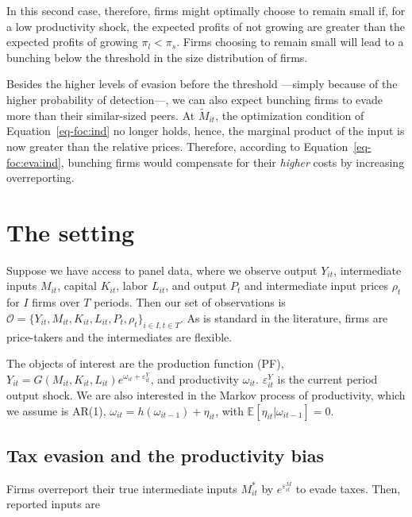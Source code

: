 \documentclass[
  12pt]{article}
\theoremstyle{definition}
\theoremstyle{remark}
\begin{document}
In this second case, therefore, firms might optimally choose to remain
small if, for a low productivity shock, the expected profits of not
growing are greater than the expected profits of growing
\(\pi_l<\pi_s\). Firms choosing to remain small will lead to a bunching
below the threshold in the size distribution of firms.

Besides the higher levels of evasion before the threshold ---simply
because of the higher probability of detection---, we can also expect
bunching firms to evade more than their similar-sized peers. At
\(\tilde{M}_{it}\), the optimization condition of
Equation~\ref{eq-foc:ind} no longer holds, hence, the marginal product
of the input is now greater than the relative prices. Therefore,
according to Equation~\ref{eq-foc:eva:ind}, bunching firms would
compensate for their \emph{higher} costs by increasing overreporting.

\hypertarget{the-setting}{%
\section{The setting}\label{the-setting}}

Suppose we have access to panel data, where we observe output
\(Y_{it}\), intermediate inputs \(M_{it}\), capital \(K_{it}\), labor
\(L_{it}\), and output \(P_{t}\) and intermediate input prices
\(\rho_t\) for \(I\) firms over \(T\) periods. Then our set of
observations is
\(\mathcal O = \{Y_{it}, M_{it}, K_{it}, L_{it}, P_{t}, \rho_t\}_{i\in I, t \in T}\).
As is standard in the literature, firms are price-takers and the
intermediates are flexible.

The objects of interest are the production function (PF),
\(Y_{it}=G(M_{it}, K_{it}, L_{it})e^{\omega_{it}+\varepsilon^Y_{it}}\),
and productivity \(\omega_{it}\). \(\varepsilon^Y_{it}\) is the current
period output shock. We are also interested in the Markov process of
productivity, which we assume is AR(1),
\(\omega_{it}=h(\omega_{it-1})+\eta_{it}\), with
\(\mathbb{E}[\eta_{it}|\omega_{it-1}]=0\).

\hypertarget{tax-evasion-and-the-productivity-bias}{%
\subsection{Tax evasion and the productivity
bias}\label{tax-evasion-and-the-productivity-bias}}

Firms overreport their true intermediate inputs \(M^*_{it}\) by
\(e^{\varepsilon^M_{it}}\) to evade taxes. Then, reported inputs are
\end{document}
